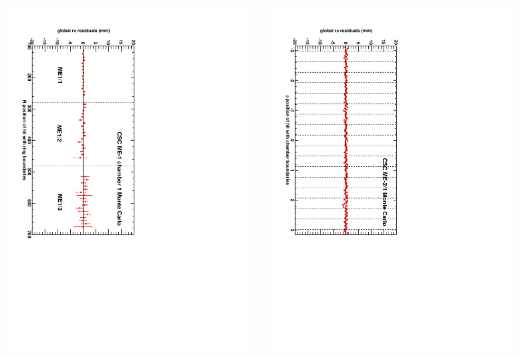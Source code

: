 \documentclass[compress]{beamer}
\begin{document}
\begin{frame}
\begin{minipage}{\linewidth}
\begin{columns}
\includegraphics[height=1.1\linewidth, angle=90]{CSCrphires_vsR_MEm1ch01_MC.pdf}

\includegraphics[height=1.1\linewidth, angle=90]{CSCrphires_vsphi_MEm21_MC.pdf}

\vspace{0.3 cm}
\end{columns}
\end{minipage}
\end{frame}
\end{document}
